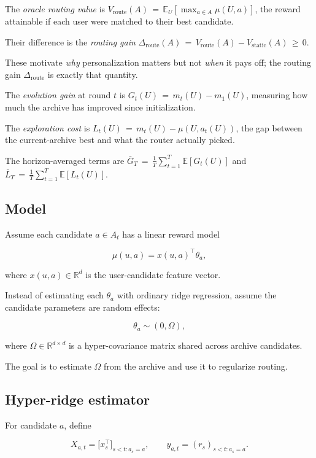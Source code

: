 \documentclass{article} %
\providecommand{\E}{\mathbb{E}}
\begin{document}
The \emph{oracle routing value} is $V_{\mathrm{route}}(A) \,=\, \E_{U}[\max_{a \in A} \mu(U,a)]$, the reward attainable if each user were matched to their best candidate.

Their difference is the \emph{routing gain} $\Delta_{\mathrm{route}}(A) \,=\, V_{\mathrm{route}}(A) - V_{\mathrm{static}}(A) \,\geq\, 0$.

These motivate \emph{why} personalization matters but not \emph{when} it pays off; the routing gain $\Delta_{\mathrm{route}}$ is exactly that quantity.

The \emph{evolution gain} at round $t$ is $G_t(U) \,=\, m_t(U) - m_1(U)$, measuring how much the archive has improved since initialization.

The \emph{exploration cost} is $L_t(U) \,=\, m_t(U) - \mu(U, a_t(U))$, the gap between the current-archive best and what the router actually picked.

The horizon-averaged terms are $\bar G_T \,=\, \frac{1}{T}\sum_{t=1}^T \E[G_t(U)]$ and $\bar L_T \,=\, \frac{1}{T}\sum_{t=1}^T \E[L_t(U)]$.

\subsection{Model}

Assume each candidate $a \in A_t$ has a linear reward model

\[
\mu(u, a) = x(u, a)^\top \theta_a ,
\]

where $x(u, a) \in \mathbb{R}^d$ is the user-candidate feature vector.

Instead of estimating each $\theta_a$ with ordinary ridge regression, assume
the candidate parameters are random effects:

\[
\theta_a \sim (0, \Omega),
\]

where $\Omega \in \mathbb{R}^{d \times d}$ is a hyper-covariance matrix shared
across archive candidates.

The goal is to estimate $\Omega$ from the archive and use it to regularize
routing.

\subsection{Hyper-ridge estimator}

For candidate $a$, define

\[
X_{a,t} = \bigl[ x_s^\top \bigr]_{s < t : a_s = a}, \qquad
y_{a,t} = (r_s)_{s < t : a_s = a}.
\]
\end{document}
